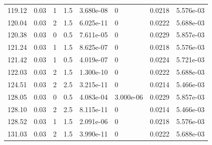 \documentclass[preview]{standalone}
\begin{document}
{{{\begin{tabular}{L{1.2cm}C{1.2cm} C{0.3cm}C{0.5cm} C{1.4cm}C{1.4cm} C{1.4cm}C{1.4cm}}
  119.12  &  0.03  & 1     & 1.5 &  3.680e-08  & 0  & 0.0218 &  5.576e-03   \\ 
  120.04  &  0.03  & 2     & 1.5 &  6.025e-11  & 0  & 0.0222 &  5.688e-03   \\ 
  120.38  &  0.03  & 0     & 0.5 &  7.611e-05  & 0  & 0.0229 &  5.857e-03   \\ 
  121.24  &  0.03  & 1     & 1.5 &  8.625e-07  & 0  & 0.0218 &  5.576e-03   \\ 
  121.42  &  0.03  & 1     & 0.5 &  4.019e-07  & 0  & 0.0224 &  5.721e-03   \\ 
  122.03  &  0.03  & 2     & 1.5 &  1.300e-10  & 0  & 0.0222 &  5.688e-03   \\ 
  124.51  &  0.03  & 2     & 2.5 &  3.215e-11  & 0  & 0.0214 &  5.466e-03   \\ 
  128.05  &  0.03  & 0     & 0.5 &  4.083e-04  & 3.000e-06  & 0.0229 &  5.857e-03   \\ 
  128.10  &  0.03  & 2     & 2.5 &  8.115e-11  & 0  & 0.0214 &  5.466e-03   \\ 
  128.52  &  0.03  & 1     & 1.5 &  2.091e-06  & 0  & 0.0218 &  5.576e-03   \\ 
  131.03  &  0.03  & 2     & 1.5 &  3.990e-11  & 0  & 0.0222 &  5.688e-03   \\ 
\hline 
\end{tabular} 

}}}
\end{document}
